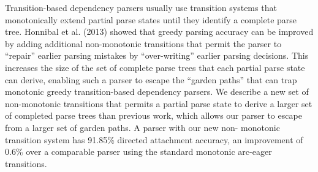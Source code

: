 Transition-based dependency parsers usually use transition systems that monotonically extend partial parse states until they identify a complete parse tree. Honnibal et al. (2013) showed that greedy parsing accuracy can be improved by adding additional non-monotonic transitions that permit the parser to ``repair'' earlier parsing mistakes by ``over-writing'' earlier parsing decisions. This increases the size of the set of complete parse trees that each partial parse state can derive, enabling such a parser to escape the ``garden paths'' that can trap monotonic greedy transition-based dependency parsers. We describe a new set of non-monotonic transitions that permits a partial parse state to derive a larger set of completed parse trees than previous work, which allows our parser to escape from a larger set of garden paths. A parser with our new non- monotonic transition system has 91.85\% directed attachment accuracy, an improvement of 0.6\% over a comparable parser using the standard monotonic arc-eager transitions.

